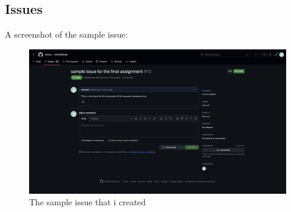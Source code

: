 \documentclass[titlepage]{article}
\begin{document}
\subsection{Issues}
A screenshot of the sample issue:
\begin{figure}[h]
\centering
\includegraphics[width=1\textwidth]{sample-issue.png} 
\caption{The sample issue that i created}
\end{figure}
\end{document}
